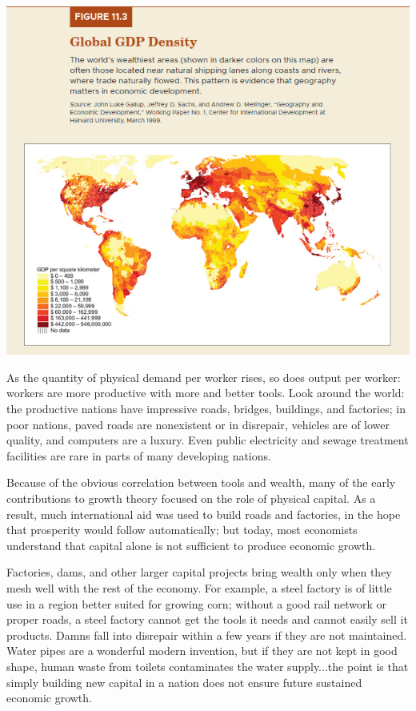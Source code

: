 \documentclass[11pt]{article} %
\begin{document}
\begin{center}
\includegraphics[scale=0.4]{../../images/Chapter 11/Figure 11.3 .png}
\end{center}

As the quantity of physical demand per worker rises, so does output per worker: workers are more productive with more and better tools. Look around the world: the productive nations have impressive roads, bridges, buildings, and factories; in poor nations, paved roads are nonexistent or in disrepair, vehicles are of lower quality, and computers are a luxury. Even public electricity and sewage treatment facilities are rare in parts of many developing nations.

Because of the obvious correlation between tools and wealth, many of the early contributions to growth theory focused on the role of physical capital. As a result, much international aid was used to build roads and factories, in the hope that prosperity would follow automatically; but today, most economists understand that capital alone is not sufficient to produce economic growth.

Factories, dams, and other larger capital projects bring wealth only when they mesh well with the rest of the economy. For example, a steel factory is of little use in a region better suited for growing corn; without a good rail network or proper roads, a steel factory cannot get the tools it needs and cannot easily sell it products. Damns fall into disrepair within a few years if they are not maintained. Water pipes are a wonderful modern invention, but if they are not kept in good shape, human waste from toilets contaminates the water supply...the point is that simply building new capital in a nation does not ensure future sustained economic growth.
\end{document}
